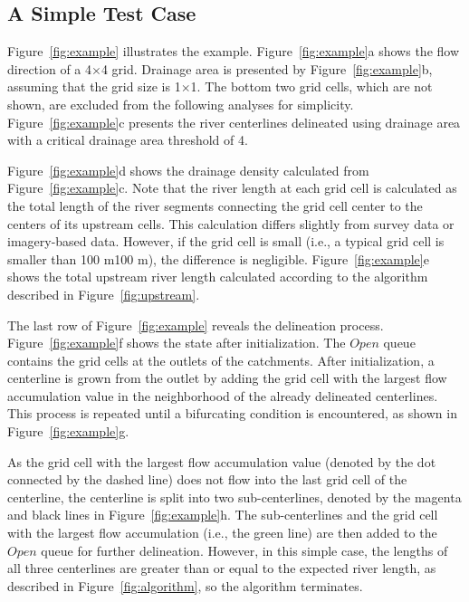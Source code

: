 \documentclass[water,article,submit,pdftex,moreauthors]{Definitions/mdpi}
\begin{document}
\subsection{A Simple Test Case}
\label{sec:test_case}

Figure~\ref{fig:example} illustrates the example. Figure~\ref{fig:example}a shows the flow direction of a 4$\times$4 grid. Drainage area is presented by Figure~\ref{fig:example}b, assuming that the grid size is 1$\times$1. The bottom two grid cells, which are not shown, are excluded from the following analyses for simplicity. Figure~\ref{fig:example}c presents the river centerlines delineated using drainage area with a critical drainage area threshold of 4.

Figure~\ref{fig:example}d shows the drainage density calculated from Figure~\ref{fig:example}c. Note that the river length at each grid cell is calculated as the total length of the river segments connecting the grid cell center to the centers of its upstream cells. This calculation differs slightly from survey data or imagery-based data. However, if the grid cell is small (i.e., a typical grid cell is smaller than 100 m\texttimes{}100 m), the difference is negligible. Figure~\ref{fig:example}e shows the total upstream river length calculated according to the algorithm described in Figure~\ref{fig:upstream}.

The last row of Figure~\ref{fig:example} reveals the delineation process. Figure~\ref{fig:example}f shows the state after initialization. The $Open$ queue contains the grid cells at the outlets of the catchments. After initialization, a centerline is grown from the outlet by adding the grid cell with the largest flow accumulation value in the neighborhood of the already delineated centerlines. This process is repeated until a bifurcating condition is encountered, as shown in Figure~\ref{fig:example}g.

As the grid cell with the largest flow accumulation value (denoted by the dot connected by the dashed line) does not flow into the last grid cell of the centerline, the centerline is split into two sub-centerlines, denoted by the magenta and black lines in Figure~\ref{fig:example}h. The sub-centerlines and the grid cell with the largest flow accumulation (i.e., the green line) are then added to the $Open$ queue for further delineation. However, in this simple case, the lengths of all three centerlines are greater than or equal to the expected river length, as described in Figure~\ref{fig:algorithm}, so the algorithm terminates.
\end{document}
